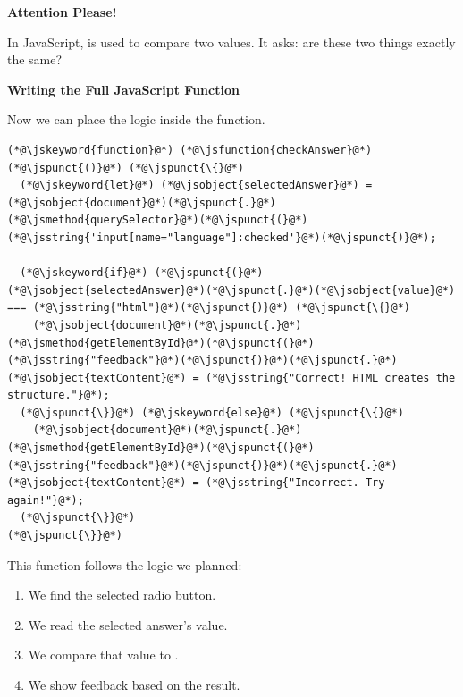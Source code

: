 \documentclass{article}
\begin{document}
\vspace{0.3cm}

\begin{attentionbox}
  \textbf{\Bitter\textcolor{naranja}{Attention Please!}}

  In JavaScript, \inlinejsmethod{===} is used to compare two values.
  It asks: are these two things exactly the same?
\end{attentionbox}

\vspace{0.4cm}

\textbf{\Bitter\textcolor{naranja}{Writing the Full JavaScript Function}}

\vspace{0.1cm}

Now we can place the logic inside the function.

\vspace{0.2cm}

\begin{lstlisting}
(*@\jskeyword{function}@*) (*@\jsfunction{checkAnswer}@*)(*@\jspunct{()}@*) (*@\jspunct{\{}@*)
  (*@\jskeyword{let}@*) (*@\jsobject{selectedAnswer}@*) = (*@\jsobject{document}@*)(*@\jspunct{.}@*)(*@\jsmethod{querySelector}@*)(*@\jspunct{(}@*)(*@\jsstring{'input[name="language"]:checked'}@*)(*@\jspunct{)}@*);

  (*@\jskeyword{if}@*) (*@\jspunct{(}@*)(*@\jsobject{selectedAnswer}@*)(*@\jspunct{.}@*)(*@\jsobject{value}@*) === (*@\jsstring{"html"}@*)(*@\jspunct{)}@*) (*@\jspunct{\{}@*)
    (*@\jsobject{document}@*)(*@\jspunct{.}@*)(*@\jsmethod{getElementById}@*)(*@\jspunct{(}@*)(*@\jsstring{"feedback"}@*)(*@\jspunct{)}@*)(*@\jspunct{.}@*)(*@\jsobject{textContent}@*) = (*@\jsstring{"Correct! HTML creates the structure."}@*);
  (*@\jspunct{\}}@*) (*@\jskeyword{else}@*) (*@\jspunct{\{}@*)
    (*@\jsobject{document}@*)(*@\jspunct{.}@*)(*@\jsmethod{getElementById}@*)(*@\jspunct{(}@*)(*@\jsstring{"feedback"}@*)(*@\jspunct{)}@*)(*@\jspunct{.}@*)(*@\jsobject{textContent}@*) = (*@\jsstring{"Incorrect. Try again!"}@*);
  (*@\jspunct{\}}@*)
(*@\jspunct{\}}@*)
\end{lstlisting}

\vspace{0.3cm}

This function follows the logic we planned:

\begin{enumerate}[leftmargin=1.2cm, itemsep=4pt]
  \item We find the selected radio button.
  \item We read the selected answer's value.
  \item We compare that value to .
  \item We show feedback based on the result.
\end{enumerate}
\end{document}
